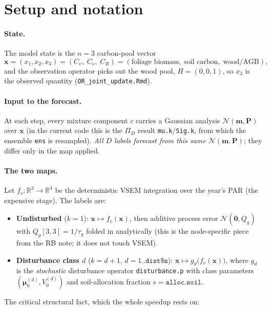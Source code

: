 \documentclass[11pt]{article}
\newcommand{\code}[1]{\texttt{#1}}
\newcommand{\R}{\mathbb{R}}
\newcommand{\bx}{\bm{x}}
\newcommand{\bm}[1]{\boldsymbol{#1}}
\newcommand{\bmu}{\bm{\mu}}
\begin{document}
\section{Setup and notation}
\label{sec:setup}

\paragraph{State.} The model state is the $n=3$ carbon-pool vector
\[
\bx = (x_1, x_2, x_3) = (C_v,\; C_s,\; C_R)
   = (\text{foliage biomass},\; \text{soil carbon},\; \text{wood/AGB}),
\]
and the observation operator picks out the wood pool, $H=(0,0,1)$, so $x_3$ is the
observed quantity (\code{OR\_joint\_update.Rmd}).

\paragraph{Input to the forecast.} At each step, every mixture component $c$ carries a
Gaussian analysis $\mathcal N(\bm m, \bm P)$ over $\bx$ (in the current code this is the
$\Pi_D$ result \code{mu.k}/\code{Sig.k}, from which the ensemble \code{ens} is
resampled). \emph{All $D$ labels forecast from this same $\mathcal N(\bm m,\bm P)$}; they
differ only in the map applied.

\paragraph{The two maps.} Let $f_v:\R^3\!\to\!\R^3$ be the deterministic VSEM
integration over the year's PAR (the expensive stage). The labels are:
\begin{itemize}[nosep]
  \item \textbf{Undisturbed} ($k=1$): $\bx \mapsto f_v(\bx)$, then additive process error
        $\mathcal N(\bm 0, Q_g)$ with $Q_g[3,3]=1/\tau_g$ folded in analytically (this is
        the node-specific piece from the RB note; it does not touch VSEM).
  \item \textbf{Disturbance class $d$} ($k=d+1$, $d=1..\code{dist\$n}$):
        $\bx \mapsto g_d\!\big(f_v(\bx)\big)$, where $g_d$ is the \emph{stochastic}
        disturbance operator \code{disturbance.p} with class parameters
        $(\bmu_0^{(d)}, V_0^{(d)})$ and soil-allocation fraction $s=\code{alloc.soil}$.
\end{itemize}
The critical structural fact, which the whole speedup rests on:
\begin{center}
\end{center}
\end{document}
